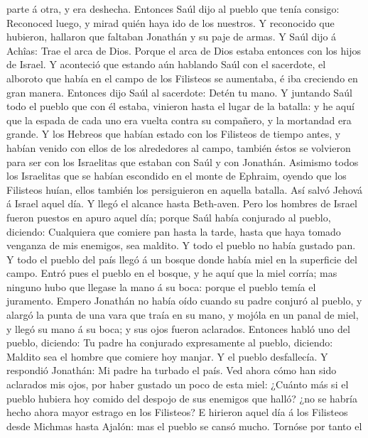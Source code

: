parte á otra, y era deshecha.  Entonces Saúl dijo al pueblo
que tenía consigo: Reconoced luego, y mirad quién haya ido de los
nuestros. Y reconocido que hubieron, hallaron que faltaban Jonathán y su
paje de armas.  Y Saúl dijo á Achîas: Trae el arca de Dios.
Porque el arca de Dios estaba entonces con los hijos de Israel.
 Y aconteció que estando aún hablando Saúl con el
sacerdote, el alboroto que había en el campo de los Filisteos se
aumentaba, é iba creciendo en gran manera. Entonces dijo Saúl al
sacerdote: Detén tu mano.  Y juntando Saúl todo el pueblo
que con él estaba, vinieron hasta el lugar de la batalla: y he aquí que
la espada de cada uno era vuelta contra su compañero, y la mortandad era
grande.  Y los Hebreos que habían estado con los Filisteos
de tiempo antes, y habían venido con ellos de los alrededores al campo,
también éstos se volvieron para ser con los Israelitas que estaban con
Saúl y con Jonathán.  Asimismo todos los Israelitas que se
habían escondido en el monte de Ephraim, oyendo que los Filisteos huían,
ellos también los persiguieron en aquella batalla.  Así
salvó Jehová á Israel aquel día. Y llegó el alcance hasta Beth-aven.
 Pero los hombres de Israel fueron puestos en apuro aquel
día; porque Saúl había conjurado al pueblo, diciendo: Cualquiera que
comiere pan hasta la tarde, hasta que haya tomado venganza de mis
enemigos, sea maldito. Y todo el pueblo no había gustado pan.
 Y todo el pueblo del país llegó á un bosque donde había
miel en la superficie del campo.  Entró pues el pueblo en
el bosque, y he aquí que la miel corría; mas ninguno hubo que llegase la
mano á su boca: porque el pueblo temía el juramento. 
Empero Jonathán no había oído cuando su padre conjuró al pueblo, y
alargó la punta de una vara que traía en su mano, y mojóla en un panal
de miel, y llegó su mano á su boca; y sus ojos fueron aclarados.
 Entonces habló uno del pueblo, diciendo: Tu padre ha
conjurado expresamente al pueblo, diciendo: Maldito sea el hombre que
comiere hoy manjar. Y el pueblo desfallecía.  Y respondió
Jonathán: Mi padre ha turbado el país. Ved ahora cómo han sido aclarados
mis ojos, por haber gustado un poco de esta miel:  ¿Cuánto
más si el pueblo hubiera hoy comido del despojo de sus enemigos que
halló? ¿no se habría hecho ahora mayor estrago en los Filisteos?
 E hirieron aquel día á los Filisteos desde Michmas hasta
Ajalón: mas el pueblo se cansó mucho.  Tornóse por tanto el
